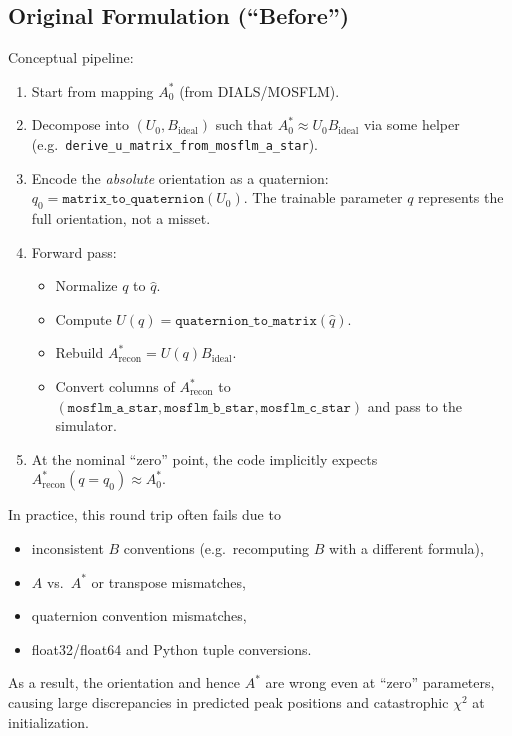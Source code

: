 \documentclass[11pt]{article}
\begin{document}
\subsection{Original Formulation (``Before'')}

Conceptual pipeline:

\begin{enumerate}
  \item Start from mapping $A^\ast_0$ (from DIALS/MOSFLM).
  \item Decompose into $(U_0, B_{\text{ideal}})$ such that
        $A^\ast_0 \approx U_0 B_{\text{ideal}}$ via some helper
        (e.g.\ \verb|derive_u_matrix_from_mosflm_a_star|).
  \item Encode the \emph{absolute} orientation as a quaternion:
        $q_0 = \texttt{matrix\_to\_quaternion}(U_0)$.
        The trainable parameter $q$ represents the full orientation, not a misset.
  \item Forward pass:
        \begin{itemize}
          \item Normalize $q$ to $\hat{q}$.
          \item Compute $U(q) = \texttt{quaternion\_to\_matrix}(\hat{q})$.
          \item Rebuild $A^\ast_{\text{recon}} = U(q) B_{\text{ideal}}$.
          \item Convert columns of $A^\ast_{\text{recon}}$ to
                $(\texttt{mosflm\_a\_star},\texttt{mosflm\_b\_star},\texttt{mosflm\_c\_star})$
                and pass to the simulator.
        \end{itemize}
  \item At the nominal ``zero'' point, the code implicitly expects
        $A^\ast_{\text{recon}}(q=q_0) \approx A^\ast_0$.
\end{enumerate}

In practice, this round trip often fails due to
\begin{itemize}
  \item inconsistent $B$ conventions (e.g.\ recomputing $B$ with a different formula),
  \item $A$ vs.\ $A^\ast$ or transpose mismatches,
  \item quaternion convention mismatches,
  \item float32/float64 and Python tuple conversions.
\end{itemize}
As a result, the orientation and hence $A^\ast$ are wrong even at
``zero'' parameters, causing large discrepancies in predicted peak positions
and catastrophic $\chi^2$ at initialization.
\end{document}
